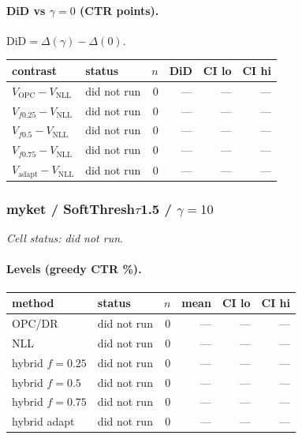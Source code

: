 \documentclass[10pt,a4paper]{article}
\begin{document}
\paragraph{DiD vs $\gamma=0$ (CTR points).} $\mathrm{DiD}=\Delta(\gamma)-\Delta(0)$.
{\centering\small\begin{tabular}{llrrrr}
\toprule contrast & status & $n$ & DiD & CI lo & CI hi \\
\midrule
$V_{\mathrm{OPC}}-V_{\mathrm{NLL}}$ & did not run & 0 & --- & --- & --- \\
$V_{f0.25}-V_{\mathrm{NLL}}$ & did not run & 0 & --- & --- & --- \\
$V_{f0.5}-V_{\mathrm{NLL}}$ & did not run & 0 & --- & --- & --- \\
$V_{f0.75}-V_{\mathrm{NLL}}$ & did not run & 0 & --- & --- & --- \\
$V_{\mathrm{adapt}}-V_{\mathrm{NLL}}$ & did not run & 0 & --- & --- & --- \\
\bottomrule\end{tabular}\par}
\bigskip
\subsubsection{myket / SoftThresh$\tau$1.5 / $\gamma=10$}
\emph{Cell status: did not run}.
\paragraph{Levels (greedy CTR \%).}
{\centering\small\begin{tabular}{llrrrr}
\toprule method & status & $n$ & mean & CI lo & CI hi \\
\midrule
OPC/DR & did not run & 0 & --- & --- & --- \\
NLL & did not run & 0 & --- & --- & --- \\
hybrid $f{=}0.25$ & did not run & 0 & --- & --- & --- \\
hybrid $f{=}0.5$ & did not run & 0 & --- & --- & --- \\
hybrid $f{=}0.75$ & did not run & 0 & --- & --- & --- \\
hybrid adapt & did not run & 0 & --- & --- & --- \\
\bottomrule\end{tabular}\par}
\end{document}
